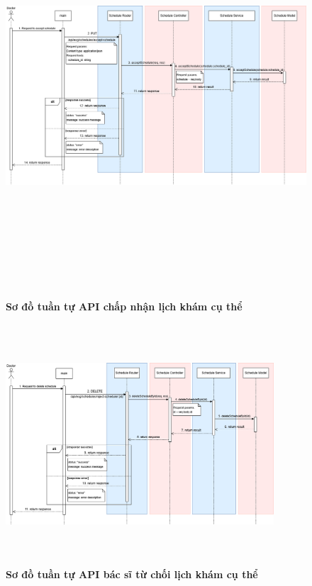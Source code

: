 \begin{figure}[H]
	\centering
	\includegraphics[width=15cm,height=15cm]{Images/api_sequence/schedule/acceptSchedule.drawio.png}
	\caption[Sơ đồ tuần tự API chấp nhận lịch khám cụ thể]{\bfseries \fontsize{12pt}{0pt}\selectfont Sơ đồ tuần tự API chấp nhận lịch khám cụ thể}
	\label{sequence_diagram_accept_schedule}
\end{figure}

\begin{figure}[H]
	\centering
	\includegraphics[width=10cm,height=9cm]{Images/api_sequence/schedule/deleteScheduleById.drawio.png}
	\caption[Sơ đồ tuần tự API từ chối lịch khám cụ thể]{\bfseries \fontsize{12pt}{0pt}\selectfont Sơ đồ tuần tự API bác sĩ từ chối lịch khám cụ thể}
	\label{sequence_diagram_reject_schedule}
\end{figure}
